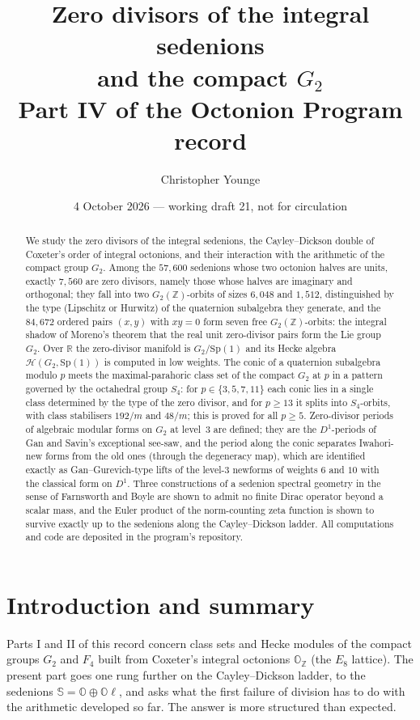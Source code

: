 \documentclass[11pt]{amsart}
\title[Zero divisors of the integral sedenions]{Zero divisors of the integral sedenions\\ and the compact $G_2$\\[4pt] {\normalsize Part IV of the Octonion Program record}}
\author{Christopher Younge}
\date{4 October 2026 --- working draft 21, not for circulation}
\theoremstyle{definition}
\renewcommand{\O}{\mathbb{O}}\newcommand{\Sd}{\mathbb{S}}\newcommand{\Hq}{\mathbb{H}}\newcommand{\Z}{\mathbb{Z}}\newcommand{\Q}{\mathbb{Q}}\newcommand{\R}{\mathbb{R}}\newcommand{\C}{\mathbb{C}}\newcommand{\F}{\mathbb{F}}
\begin{document}
\begin{abstract}
We study the zero divisors of the integral sedenions, the Cayley--Dickson double of Coxeter's order of integral octonions, and their interaction with the arithmetic of the compact group $G_2$. Among the $57{,}600$ sedenions whose two octonion halves are units, exactly $7{,}560$ are zero divisors, namely those whose halves are imaginary and orthogonal; they fall into two $G_2(\Z)$-orbits of sizes $6{,}048$ and $1{,}512$, distinguished by the type (Lipschitz or Hurwitz) of the quaternion subalgebra they generate, and the $84{,}672$ ordered pairs $(x,y)$ with $xy=0$ form seven free $G_2(\Z)$-orbits: the integral shadow of Moreno's theorem that the real unit zero-divisor pairs form the Lie group $G_2$. Over $\R$ the zero-divisor manifold is $G_2/\mathrm{Sp}(1)$ and its Hecke algebra $\mathcal H(G_2,\mathrm{Sp}(1))$ is computed in low weights. The conic of a quaternion subalgebra modulo $p$ meets the maximal-parahoric class set of the compact $G_2$ at $p$ in a pattern governed by the octahedral group $S_4$: for $p\in\{3,5,7,11\}$ each conic lies in a single class determined by the type of the zero divisor, and for $p\ge 13$ it splits into $S_4$-orbits, with class stabilisers $192/m$ and $48/m$; this is proved for all $p\ge 5$. Zero-divisor periods of algebraic modular forms on $G_2$ at level~3 are defined; they are the $D^1$-periods of Gan and Savin's exceptional see-saw, and the period along the conic separates Iwahori-new forms from the old ones (through the degeneracy map), which are identified exactly as Gan--Gurevich-type lifts of the level-$3$ newforms of weights $6$ and $10$ with the classical form on $D^1$. Three constructions of a sedenion spectral geometry in the sense of Farnsworth and Boyle are shown to admit no finite Dirac operator beyond a scalar mass, and the Euler product of the norm-counting zeta function is shown to survive exactly up to the sedenions along the Cayley--Dickson ladder. All computations and code are deposited in the program's repository.
\end{abstract}
\maketitle
\tableofcontents

\section{Introduction and summary}
Parts I and II of this record \cite{PartI,PartII} concern class sets and Hecke modules of the compact groups $G_2$ and $F_4$ built from Coxeter's integral octonions $\O_\Z$ (the $E_8$ lattice). The present part goes one rung further on the Cayley--Dickson ladder, to the sedenions $\Sd=\O\oplus\O\ell$, and asks what the first failure of division has to do with the arithmetic developed so far. The answer is more structured than expected.
\end{document}
